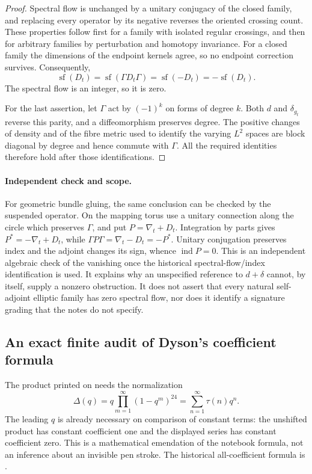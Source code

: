 \begin{proof}
Spectral flow is unchanged by a unitary conjugacy of the closed family, and
replacing every operator by its negative reverses the oriented crossing
count.  These properties follow first for a family with isolated regular
crossings, and then for arbitrary families by perturbation and homotopy
invariance.  For a closed family the dimensions of the endpoint kernels
agree, so no endpoint correction survives.  Consequently,
\[
\operatorname{sf}(D_t)=\operatorname{sf}(\Gamma D_t\Gamma)
=\operatorname{sf}(-D_t)=-\operatorname{sf}(D_t).
\]
The spectral flow is an integer, so it is zero.

For the last assertion, let \(\Gamma\) act by \((-1)^k\) on forms of degree
\(k\).  Both \(d\) and \(\delta_{g_t}\) reverse this parity, and a
diffeomorphism preserves degree.  The positive changes of density and of the
fibre metric used to identify the varying \(L^2\) spaces are block diagonal
by degree and hence commute with \(\Gamma\).  All the required identities
therefore hold after those identifications.
\end{proof}

\paragraph{Independent check and scope.}
For geometric bundle gluing, the same conclusion can be checked by the
suspended operator.  On the mapping torus use a unitary connection along the circle which preserves
\(\Gamma\), and put \(P=\nabla_t+D_t\).  Integration by parts gives
\(P^*=-\nabla_t+D_t\), while
\(\Gamma P\Gamma=\nabla_t-D_t=-P^*\).  Unitary conjugation preserves index
and the adjoint changes its sign, whence \(\operatorname{ind}P=0\).  This is
an independent algebraic check of the vanishing once the historical
spectral-flow/index identification is used.  It explains why an unspecified
reference to \(d+\delta\) cannot, by itself, supply a nonzero obstruction.
It does not assert that every natural self-adjoint elliptic family has zero
spectral flow, nor does it identify a signature grading that the notes do not
specify.

\subsection{An exact finite audit of Dyson's coefficient formula}
\label{verification:dyson}

The product printed on  needs the normalization
\[
\Delta(q)=q\prod_{m=1}^{\infty}(1-q^m)^{24}
=\sum_{n=1}^{\infty}\tau(n)q^n.
\]
The leading \(q\) is already necessary on comparison of constant terms:
the unshifted product has constant coefficient one and the displayed series
has constant coefficient zero.  This is a mathematical emendation of the
notebook formula, not an inference about an invisible pen stroke.
The historical all-coefficient formula is
\citet[pp.636--637, equations (1)--(3)]{dyson1972missed}.

